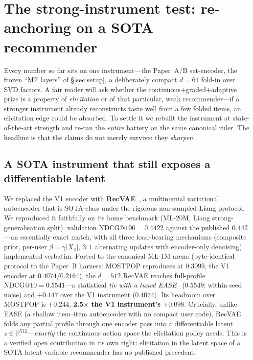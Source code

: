 \documentclass[11pt]{article}
\newcommand{\R}{\mathbb{R}}
\begin{document}
\section{The strong-instrument test: re-anchoring on a SOTA recommender}\label{sec:i2}
Every number so far sits on one instrument---the Paper~A/B set-encoder, the frozen ``MF layers'' of \S\ref{sec:setup}, a
deliberately compact $d{=}64$ fold-in over SVD factors. A fair reader will ask whether the continuous$+$graded$+$adaptive
prize is a property of \emph{elicitation} or of that particular, weak recommender---if a stronger instrument already
reconstructs taste well from a few folded items, an elicitation edge could be absorbed. To settle it we rebuilt the
instrument at state-of-the-art strength and re-ran the \emph{entire} battery on the same canonical ruler. The headline is
that the claims do not merely survive: they \emph{sharpen}.

\subsection{A SOTA instrument that still exposes a differentiable latent}\label{sec:i2instrument}
We replaced the V1 encoder with \textbf{RecVAE}~\cite{recvae}, a multinomial variational autoencoder that is SOTA-class
under the rigorous non-sampled Liang protocol. We reproduced it faithfully on its home benchmark (ML-20M, Liang
strong-generalisation split): validation $\mathrm{NDCG@100}=0.4422$ against the published $0.442$---an essentially exact
match, with all three load-bearing mechanisms (composite prior, per-user $\beta=\gamma|X_u|$, $3{:}1$ alternating updates
with encoder-only denoising) implemented verbatim. Ported to the canonical ML-1M arena (byte-identical protocol to the
Paper~B harness: MOSTPOP reproduces at $0.3099$, the V1 encoder at $0.4074/0.2164$), the $d{=}512$ RecVAE reaches
full-profile $\mathrm{NDCG@10}=0.5541$---a statistical \emph{tie with a tuned EASE}~\cite{ease} ($0.5549$; within seed
noise) and $\mathbf{+0.147}$ over the V1 instrument ($0.4074$). Its headroom over MOSTPOP is $+0.244$, \textbf{2.5$\times$
the V1 instrument's $+0.098$}. Crucially, unlike EASE (a shallow item--item autoencoder with no compact user code), RecVAE
folds any partial profile through one encoder pass into a differentiable latent $z\in\R^{512}$---\emph{exactly} the
continuous action space the elicitation policy needs. This is a verified open contribution in its own right: elicitation
in the latent space of a SOTA latent-variable recommender has no published precedent.
\end{document}
